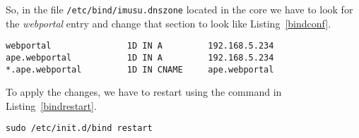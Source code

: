 So, in the file \verb|/etc/bind/imusu.dnszone| located in the  core
we have to look for the \emph{webportal} entry and change that section to look
like Listing~\vref{bindconf}.

\begin{lstlisting}[label=bindconf,caption=BIND configuration]
webportal               1D IN A         192.168.5.234
ape.webportal           1D IN A         192.168.5.234
*.ape.webportal         1D IN CNAME     ape.webportal
\end{lstlisting}

To apply the changes, we have to restart  using the command in
Listing~\vref{bindrestart}.

\begin{lstlisting}[label=bindrestart,caption=BIND restart command]
sudo /etc/init.d/bind restart
\end{lstlisting}


